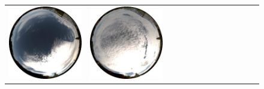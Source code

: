 \begin{figure}
\begin{tabular}{@{}rcccccccccccc@{}}
    \includegraphics[width=\customwidth]{./figures/database/20131106_135932.jpg} &
    \includegraphics[width=\customwidth]{./figures/database/20131106_142922.jpg} &

\end{tabular}
\end{figure}
